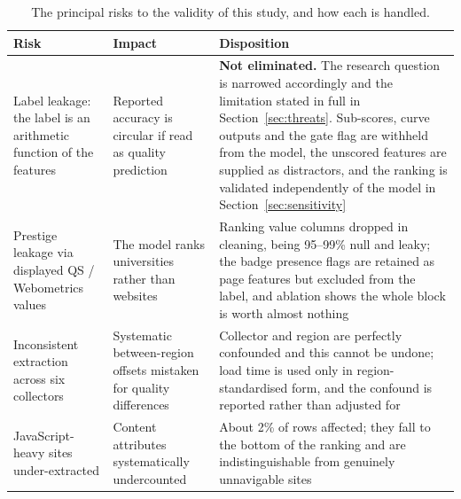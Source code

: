 \documentclass[11pt,a4paper]{article}
\begin{document}
\begin{table}[H]\centering\small
\caption{The principal risks to the validity of this study, and how each is handled.}
\begin{tabular}{p{3.3cm}p{3.9cm}p{7.3cm}}
\toprule
\textbf{Risk} & \textbf{Impact} & \textbf{Disposition} \\
\midrule
Label leakage: the label is an arithmetic function of the features &
Reported accuracy is circular if read as quality prediction &
\textbf{Not eliminated.} The research question is narrowed accordingly and the limitation stated in
full in Section~\ref{sec:threats}. Sub-scores, curve outputs and the gate flag are withheld from the
model, the \nUnscored{} unscored features are supplied as distractors, and the ranking is validated
independently of the model in Section~\ref{sec:sensitivity} \\[3pt]
Prestige leakage via displayed QS / Webometrics values &
The model ranks universities rather than websites &
Ranking value columns dropped in cleaning, being 95--99\% null and leaky; the badge presence flags are
retained as page features but excluded from the label, and ablation shows the whole block is worth
almost nothing \\[3pt]
Inconsistent extraction across six collectors &
Systematic between-region offsets mistaken for quality differences &
Collector and region are perfectly confounded and this cannot be undone; load time is used only in
region-standardised form, and the confound is reported rather than adjusted for \\[3pt]
JavaScript-heavy sites under-extracted &
Content attributes systematically undercounted &
About 2\% of rows affected; they fall to the bottom of the ranking and are indistinguishable from
genuinely unnavigable sites \\
\bottomrule
\end{tabular}
\end{table}
\end{document}
